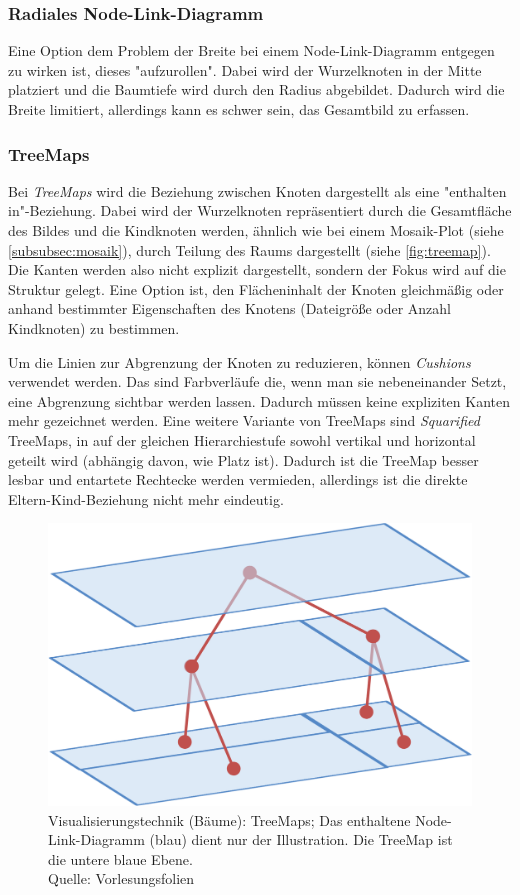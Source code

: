 			\subsubsection{Radiales Node-Link-Diagramm}
				Eine Option dem Problem der Breite bei einem Node-Link-Diagramm entgegen zu wirken ist, dieses "aufzurollen". Dabei wird der Wurzelknoten in der Mitte platziert und die Baumtiefe wird durch den Radius abgebildet. Dadurch wird die Breite limitiert, allerdings kann es schwer sein, das Gesamtbild zu erfassen.

			\subsubsection{TreeMaps}
				Bei \emph{TreeMaps} wird die Beziehung zwischen Knoten dargestellt als eine "enthalten in"-Beziehung. Dabei wird der Wurzelknoten repräsentiert durch die Gesamtfläche des Bildes und die Kindknoten werden, ähnlich wie bei einem Mosaik-Plot (siehe \autoref{subsubsec:mosaik}), durch Teilung des Raums dargestellt (siehe \autoref{fig:treemap}). Die Kanten werden also nicht explizit dargestellt, sondern der Fokus wird auf die Struktur gelegt. Eine Option ist, den Flächeninhalt der Knoten gleichmäßig oder anhand bestimmter Eigenschaften des Knotens (\zB Dateigröße oder Anzahl Kindknoten) zu bestimmen.

				Um die Linien zur Abgrenzung der Knoten zu reduzieren, können \emph{Cushions} verwendet werden. Das sind Farbverläufe die, wenn man sie nebeneinander Setzt, eine Abgrenzung sichtbar werden lassen. Dadurch müssen keine expliziten Kanten mehr gezeichnet werden. Eine weitere Variante von TreeMaps sind \emph{Squarified} TreeMaps, in auf der gleichen Hierarchiestufe sowohl vertikal und horizontal geteilt wird (abhängig davon, wie Platz ist). Dadurch ist die TreeMap besser lesbar und entartete Rechtecke werden vermieden, allerdings ist die direkte Eltern-Kind-Beziehung nicht mehr eindeutig.

				\begin{figure}
					\centering
					\includegraphics[width=0.5\linewidth]{treemap}
					\caption[Visualisierungstechnik (Bäume): TreeMaps]{Visualisierungstechnik (Bäume): TreeMaps; Das enthaltene Node-Link-Diagramm (blau) dient nur der Illustration. Die TreeMap ist die untere blaue Ebene.\\Quelle: Vorlesungsfolien}
					\label{fig:treemap}
				\end{figure}

